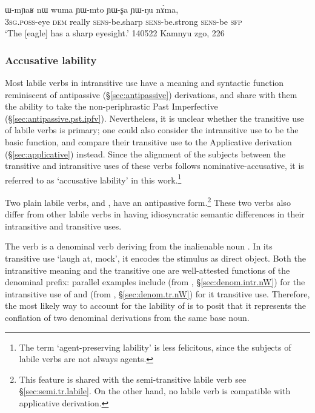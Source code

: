 \begin{exe}
\ex \label{ex:WmYaR.YWmto}
\gll ɯ-mɲaʁ nɯ wuma ɲɯ-mto ɲɯ-ʂa ɲɯ-ŋu nɤ́ma, \\
\textsc{3sg}.\textsc{poss}-eye \textsc{dem} really \textsc{sens}-be.sharp \textsc{sens}-be.strong \textsc{sens}-be \textsc{sfp} \\
\glt `The [eagle] has a sharp eyesight.' 140522 Kamnyu zgo, 226
\end{exe}


\subsubsection{Accusative lability} \label{sec:lability.apass}
 
Most labile verbs in intransitive use have a meaning and syntactic function reminiscent of antipassive (§\ref{sec:antipassive}) derivations, and share with them the ability to take the non-periphrastic Past Imperfective  (§\ref{sec:antipassive.pst.ipfv}). Nevertheless, it is unclear whether  the transitive use of labile verbs is primary; one could also consider the intransitive use to be the basic function, and compare their transitive use to the Applicative derivation (§\ref{sec:applicative}) instead. Since the alignment of the subjects between the transitive and intransitive uses of these verbs follows nominative-accusative, it is referred to as `accusative lability' in this work.\footnote{The term `agent-preserving lability' is less felicitous, since the subjects of labile verbs are not always agents.}
 
Two plain labile verbs,   and  , have an antipassive form.\footnote{This feature is shared with the semi-transitive labile verb  see §\ref{sec:semi.tr.labile}. On the other hand, no labile verb is compatible with applicative derivation. } These two verbs also differ from other labile verbs in having idiosyncratic semantic differences in their intransitive and transitive uses. 


The verb  is a denominal verb deriving from the inalienable noun . In its transitive use  `laugh at, mock', it encodes the stimulus as direct object. Both the intransitive meaning and the transitive one are well-attested functions of the  denominal prefix: parallel examples include  (from , §\ref{sec:denom.intr.nW}) for the intransitive use of  and  (from , §\ref{sec:denom.tr.nW}) for it transitive use. Therefore, the most likely way to account for the lability of  is to posit that it represents the conflation of two denominal derivations from the same base noun.

